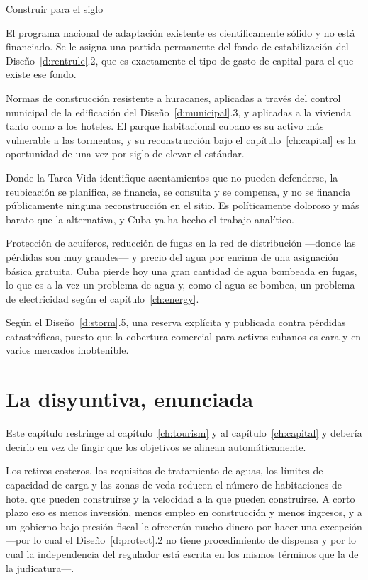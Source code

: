 \begin{design}{Construir para el siglo}
\label{d:adapt}
\begin{rules}
 El programa nacional de adaptación existente es científicamente
sólido y no está financiado. Se le asigna una partida permanente del fondo de estabilización del
Diseño~\ref{d:rentrule}.2, que es exactamente el tipo de gasto de capital para el que existe ese
fondo.

 Normas de construcción resistente a huracanes, aplicadas a través
del control municipal de la edificación del Diseño~\ref{d:municipal}.3, y aplicadas a la vivienda
tanto como a los hoteles. El parque habitacional cubano es su activo más vulnerable a las
tormentas, y su reconstrucción bajo el capítulo~\ref{ch:capital} es la oportunidad de una vez por
siglo de elevar el estándar.

 Donde la Tarea Vida identifique asentamientos que no pueden
defenderse, la reubicación se planifica, se financia, se consulta y se compensa, y no se financia
públicamente ninguna reconstrucción en el sitio. Es políticamente doloroso y más barato que la
alternativa, y Cuba ya ha hecho el trabajo analítico.

 Protección de acuíferos, reducción de fugas en la red de distribución ---donde las
pérdidas son muy grandes--- y precio del agua por encima de una asignación básica gratuita. Cuba
pierde hoy una gran cantidad de agua bombeada en fugas, lo que es a la vez un problema de agua y,
como el agua se bombea, un problema de electricidad según el capítulo~\ref{ch:energy}.

 Según el Diseño~\ref{d:storm}.5, una reserva explícita y publicada contra
pérdidas catastróficas, puesto que la cobertura comercial para activos cubanos es cara y en varios
mercados inobtenible.
\end{rules}
\end{design}

\section{La disyuntiva, enunciada}

Este capítulo restringe al capítulo~\ref{ch:tourism} y al capítulo~\ref{ch:capital} y debería
decirlo en vez de fingir que los objetivos se alinean automáticamente.

Los retiros costeros, los requisitos de tratamiento de aguas, los límites de capacidad de carga y
las zonas de veda reducen el número de habitaciones de hotel que pueden construirse y la velocidad
a la que pueden construirse. A corto plazo eso es menos inversión, menos empleo en construcción y
menos ingresos, y a un gobierno bajo presión fiscal le ofrecerán mucho dinero por hacer una
excepción ---por lo cual el Diseño~\ref{d:protect}.2 no tiene procedimiento de dispensa y por lo
cual la independencia del regulador está escrita en los mismos términos que la de la judicatura---.

